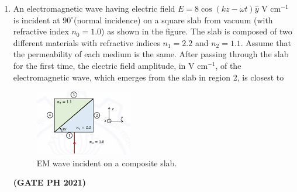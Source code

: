 \documentclass[14pt, a4paper]{extarticle}
\begin{document}
\begin{enumerate}[label=\textbf{Q.\arabic*}]
\begin{enumerate}[label=\textbf{Q.\arabic*}]
\item An electromagnetic wave having electric field $E = 8 \cos(kz - \omega t) \hat{y}$ V cm$^{-1}$ is incident at $90^{\circ}$(normal incidence) on a square slab from vacuum (with refractive index $n_0 = 1.0$) as shown in the figure. The slab is composed of two different materials with refractive indices $n_1=2.2$ and $n_2=1.1$. Assume that the permeability of each medium is the same. After passing through the slab for the first time, the electric field amplitude, in V cm$^{-1}$, of the electromagnetic wave, which emerges from the slab in region 2, is closest to
\begin{figure}[H]
\centering
\includegraphics[width=0.4\textwidth]{figs/q39fig21.png}
\caption{EM wave incident on a composite slab.}
\label{fig:q29ph}
\end{figure}
\begin{enumerate}
\end{enumerate}
\hfill \textbf{(GATE PH 2021)}


\end{enumerate}
\end{enumerate}
\end{document}
